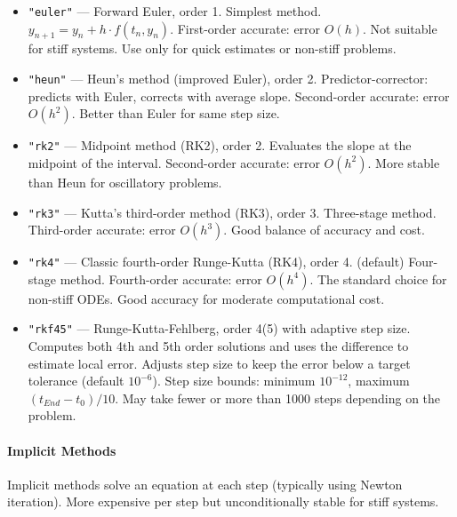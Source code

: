 \begin{itemize}
\item \texttt{"euler"} --- Forward Euler, order 1. Simplest method. $y_{n+1} = y_n + h \cdot f(t_n, y_n)$. First-order accurate: error $O(h)$. Not suitable for stiff systems. Use only for quick estimates or non-stiff problems.
\item \texttt{"heun"} --- Heun's method (improved Euler), order 2. Predictor-corrector: predicts with Euler, corrects with average slope. Second-order accurate: error $O(h^2)$. Better than Euler for same step size.
\item \texttt{"rk2"} --- Midpoint method (RK2), order 2. Evaluates the slope at the midpoint of the interval. Second-order accurate: error $O(h^2)$. More stable than Heun for oscillatory problems.
\item \texttt{"rk3"} --- Kutta's third-order method (RK3), order 3. Three-stage method. Third-order accurate: error $O(h^3)$. Good balance of accuracy and cost.
\item \texttt{"rk4"} --- Classic fourth-order Runge-Kutta (RK4), order 4. (default) Four-stage method. Fourth-order accurate: error $O(h^4)$. The standard choice for non-stiff ODEs. Good accuracy for moderate computational cost.
\item \texttt{"rkf45"} --- Runge-Kutta-Fehlberg, order 4(5) with adaptive step size. Computes both 4th and 5th order solutions and uses the difference to estimate local error. Adjusts step size to keep the error below a target tolerance (default $10^{-6}$). Step size bounds: minimum $10^{-12}$, maximum $(t_{End} - t_0) / 10$. May take fewer or more than 1000 steps depending on the problem.
\end{itemize}

\paragraph{Implicit Methods}
Implicit methods solve an equation at each step (typically using Newton iteration). More expensive per step but unconditionally stable for stiff systems.

